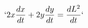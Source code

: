 \documentclass[preview]{standalone}
\begin{document}
\begin{align*}
`2x \frac{dx}{dt} + 2y \frac{dy}{dt} = \frac{dL^2}{dt}`
\end{align*}
\end{document}
